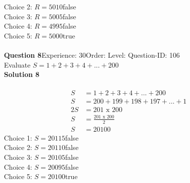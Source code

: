 \documentclass{article}
\begin{document}
Choice 2: \hspace{20pt}$R=5010$\hspace{20pt}false\\
Choice 3: \hspace{20pt}$R=5005$\hspace{20pt}false\\
Choice 4: \hspace{20pt}$R=4995$\hspace{20pt}false\\
Choice 5: \hspace{20pt}$R=5000$\hspace{20pt}true\\
\\[4pt]
\noindent\textbf{Question 8}\hspace{20pt}Experience: 30\hspace{20pt}Order: \hspace{20pt}Level: \hspace{20pt}Question-ID: 106\\[2pt]
Evaluate $S=1+2+3+4+...+200$\\[4pt]
\noindent\textbf{Solution 8}\\[2pt]
\\[-35pt]\begin{align*}
S&=1+2+3+4+...+200\\[2pt]
S&=200+199+198+197+...+1\\[2pt]
2S&=201\,\,\text{x}\,\,200\\[2pt]
S&=\displaystyle\frac{201\,\,\text{x}\,\,200}{2}\\[2pt]
S&=20100
\end{align*}
Choice 1: \hspace{20pt}$S=20115$\hspace{20pt}false\\
Choice 2: \hspace{20pt}$S=20110$\hspace{20pt}false\\
Choice 3: \hspace{20pt}$S=20105$\hspace{20pt}false\\
Choice 4: \hspace{20pt}$S=20095$\hspace{20pt}false\\
Choice 5: \hspace{20pt}$S=20100$\hspace{20pt}true\\
\\[4pt]
\end{document}
